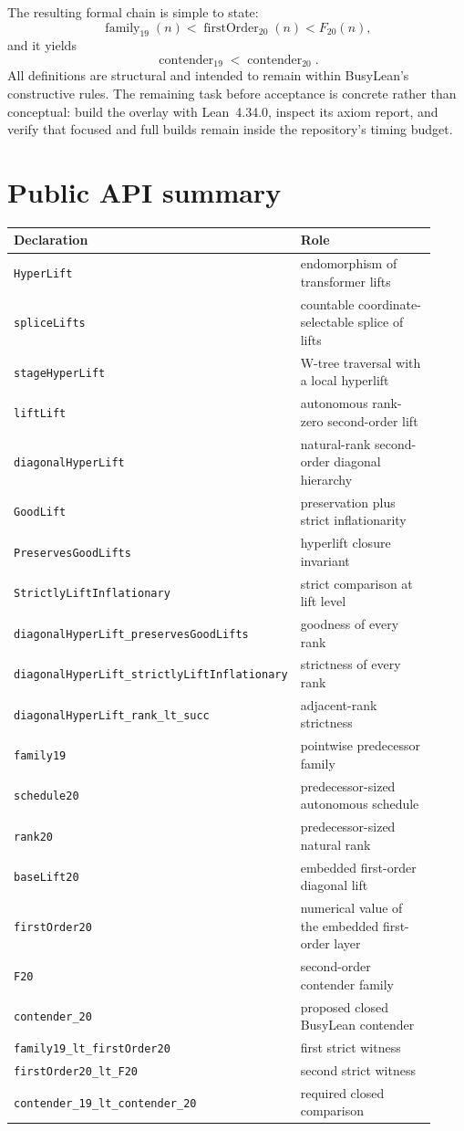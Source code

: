 \documentclass[11pt]{article}
\theoremstyle{definition}
\theoremstyle{remark}
\newcommand{\lean}[1]{\nolinkurl{#1}}
\begin{document}
The resulting formal chain is simple to state:
\[
  \operatorname{family}_{19}(n)
  < \operatorname{firstOrder}_{20}(n)
  < F_{20}(n),
\]
and it yields
\[
  \operatorname{contender}_{19}<\operatorname{contender}_{20}.
\]
All definitions are structural and intended to remain within BusyLean's
constructive rules. The remaining task before acceptance is concrete rather
than conceptual: build the overlay with Lean~4.34.0, inspect its axiom report,
and verify that focused and full builds remain inside the repository's timing
budget.

\appendix

\section{Public API summary}

\begin{longtable}{p{0.44\linewidth}p{0.48\linewidth}}
\toprule
Declaration & Role\\
\midrule
\endhead
\lean{HyperLift} & endomorphism of transformer lifts\\
\lean{spliceLifts} & countable coordinate-selectable splice of lifts\\
\lean{stageHyperLift} & W-tree traversal with a local hyperlift\\
\lean{liftLift} & autonomous rank-zero second-order lift\\
\lean{diagonalHyperLift} & natural-rank second-order diagonal hierarchy\\
\lean{GoodLift} & preservation plus strict inflationarity\\
\lean{PreservesGoodLifts} & hyperlift closure invariant\\
\lean{StrictlyLiftInflationary} & strict comparison at lift level\\
\lean{diagonalHyperLift_preservesGoodLifts} & goodness of every rank\\
\lean{diagonalHyperLift_strictlyLiftInflationary} & strictness of every rank\\
\lean{diagonalHyperLift_rank_lt_succ} & adjacent-rank strictness\\
\lean{family19} & pointwise predecessor family\\
\lean{schedule20} & predecessor-sized autonomous schedule\\
\lean{rank20} & predecessor-sized natural rank\\
\lean{baseLift20} & embedded first-order diagonal lift\\
\lean{firstOrder20} & numerical value of the embedded first-order layer\\
\lean{F20} & second-order contender family\\
\lean{contender_20} & proposed closed BusyLean contender\\
\lean{family19_lt_firstOrder20} & first strict witness\\
\lean{firstOrder20_lt_F20} & second strict witness\\
\lean{contender_19_lt_contender_20} & required closed comparison\\
\bottomrule
\end{longtable}
\end{document}
